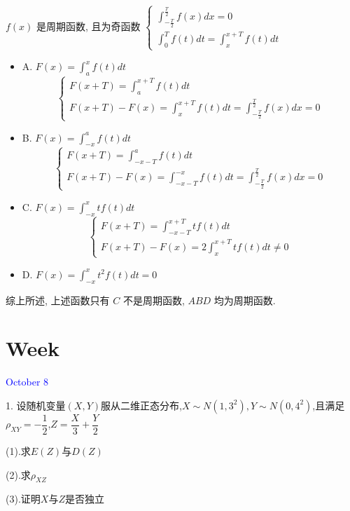 \begin{solution}

	$f(x)$ 是周期函数, 且为奇函数 $
	\begin{cases}
		\displaystyle{\int_{-\frac{T}{2}}^{\frac{T}{2}}f(x)dx = 0}\\
		\displaystyle{\int_{0}^{T}f(t)dt = \int_{x}^{x+T}f(t)dt}
	\end{cases}$
	
	\begin{itemize}
		\item A. $\displaystyle{F(x) = \int_{a}^{x}f(t)dt}$
		$$
		\begin{cases}
			\displaystyle{F(x+T) = \int_{a}^{x+T}f(t)dt}\\
			\displaystyle{F(x+T)-F(x) = \int_{x}^{x+T}f(t)dt=\int_{-\frac{T}{2}}^{\frac{T}{2}}f(x)dx = 0}
		\end{cases}
		$$
		\item B. $\displaystyle{F(x)=\int_{-x}^{a}f(t)dt}$
		$$
		\begin{cases}
			\displaystyle{F(x+T) = \int_{-x-T}^{a}f(t)dt}\\
			\displaystyle{F(x+T)-F(x) = \int_{-x-T}^{-x}f(t)dt = \int_{-\frac{T}{2}}^{\frac{T}{2}}f(x)dx = 0}
		\end{cases}
		$$ 
		\item C. $\displaystyle{F(x)=\int_{-x}^{x}tf(t)dt}$
		$$
		\begin{cases}
			\displaystyle{F(x+T) = \int_{-x-T}^{x+T}tf(t)dt}\\
			\displaystyle{F(x+T)-F(x) = 2\int_{x}^{x+T}tf(t)dt\neq 0}
		\end{cases}
		$$ 
		\item D. $\displaystyle{F(x)=\int_{-x}^{x}t^{2}f(t)dt = 0}$
	\end{itemize}
	
	综上所述, 上述函数只有 $C$ 不是周期函数, $ABD$ 均为周期函数.
\end{solution}


\section{Week }
\textcolor{blue}{October 8}

1. 设随机变量$(X,Y)$服从二维正态分布,$X\sim N(1,3^2),Y\sim N(0,4^2)$,且满足$\rho_{XY}=-\dfrac{1}{2}$,$Z=\dfrac{X}{3}+\dfrac{Y}{2}$

(1).求$E(Z)$与$D(Z)$

(2).求$\rho_{XZ}$

(3).证明$X$与$Z$是否独立

